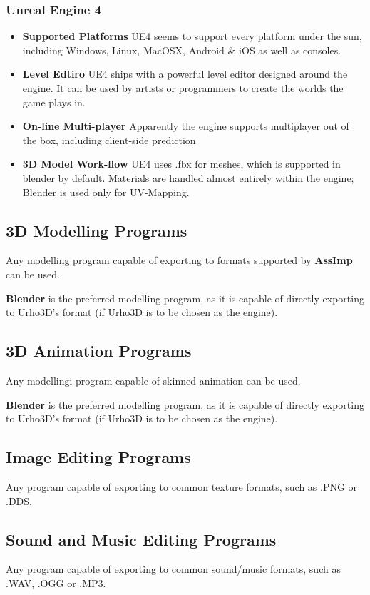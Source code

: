 \subsubsection*{Unreal Engine 4}
\begin{itemize}
    \item \textbf{Supported Platforms}
        UE4 seems to support every platform under the sun, including Windows, Linux, MacOSX, Android \& iOS as well as consoles. 
    \item \textbf{Level Edtiro}
        UE4 ships with a powerful level  editor  designed  around  the engine. It can be
        used  by  artists  or  programmers  to  create  the  worlds the game  plays  in.
    \item \textbf{On-line Multi-player}
        Apparently the engine supports multiplayer out of the box, including client-side prediction
    \item \textbf{3D Model Work-flow}
        UE4 uses .fbx for meshes, which is supported in blender by default. Materials are handled almost entirely within the engine;
        Blender is used only for UV-Mapping.
\end{itemize}


\subsection{3D Modelling Programs}

Any   modelling   program   capable   of   exporting  to  formats  supported  by
\textbf{AssImp} can be used.

\textbf{Blender}  is  the  preferred  modelling  program, as it  is  capable  of
directly exporting to Urho3D's format (if Urho3D is to be chosen as the engine).


\subsection{3D Animation Programs}

Any modellingi program capable of skinned animation can be used.

\textbf{Blender}  is  the  preferred  modelling  program,  as  it  is capable of
directly exporting to Urho3D's format (if Urho3D is to be chosen as the engine).


\subsection{Image Editing Programs}

Any program capable of exporting to common texture formats, such as .PNG or .DDS.


\subsection{Sound and Music Editing Programs}

Any program capable of exporting to common sound/music formats, such as .WAV, .OGG or .MP3.


